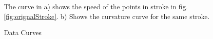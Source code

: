 \documentclass[a4paper,10pt]{IEEEconf}
\begin{document}
\begin{figure}[]
	\centering

					\hspace{20 mm}
	\caption{Data Curves} The curve in a) shows the speed of the points in stroke in fig. \ref{fig:orignalStroke}. b) Shows the curvature curve for the same stroke.  %
	
	\label{fig:speed2}
\end{figure}
\end{document}
